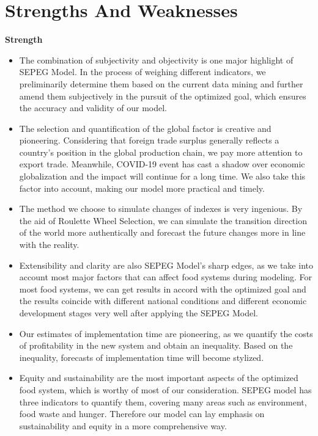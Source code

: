 \documentclass{mcmthesis}
\begin{document}
\section{Strengths And Weaknesses}
\textbf{Strength}
\begin{itemize}
    \item The combination of subjectivity and objectivity is one major highlight of SEPEG Model. In the process of weighing different indicators, we preliminarily determine them based on the current data mining and further amend them subjectively in the pursuit of the optimized goal, which ensures the accuracy and validity of our model.
    
    \item The selection and quantification of the global factor is creative and pioneering. Considering that foreign trade surplus generally reflects a country's position in the global production chain, we pay more attention to export trade. Meanwhile, COVID-19 event has cast a shadow over economic globalization and the impact will continue for a long time. We also take this factor into account, making our model more practical and timely.
    
    \item The method we choose to simulate changes of indexes is very ingenious. By the aid of Roulette Wheel Selection, we can simulate the transition direction of the world more authentically and forecast the future changes more in line with the reality.
    
    \item Extensibility and clarity are also SEPEG Model's sharp edges, as we take into account most major factors that can affect food systems during modeling. For most food systems, we can get results in accord with the optimized goal and the results coincide with different national conditions and different economic development stages very well after applying the SEPEG Model.
    \item Our estimates of implementation time are pioneering,  as we quantify the costs of profitability in the new system and obtain an inequality. Based on the inequality, forecasts of implementation time will become stylized.
    \item Equity and sustainability are the most important aspects of the optimized food system, which is worthy of  most of our consideration. SEPEG model has three indicators to quantify them, covering many areas such as environment, food waste and hunger. Therefore our model can lay emphasis on sustainability and equity in a more comprehensive way.
    
\end{itemize}
\end{document}
